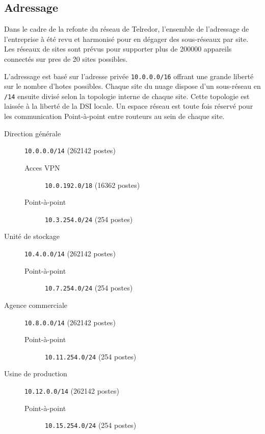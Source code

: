 \documentclass{article}
\newcommand{\tlr}{Telredor\xspace}
\begin{document}
\subsection{Adressage}

Dans le cadre de la refonte du réseau de \tlr, l'ensemble de l'adressage de l'entreprise à été revu et harmonisé pour en dégager des sous-réseaux par site.
Les réseaux de sites sont prévus pour supporter plus de 200000 appareils connectés sur pres de 20 sites possibles.

L'adressage est basé sur l'adresse privée \texttt{10.0.0.0/16} offrant une grande liberté sur le nombre d'hotes possibles.
Chaque site du nuage dispose d'un sous-réseau en \texttt{/14} ensuite divisé selon la topologie interne de chaque site.
Cette topologie est laissée à la liberté de la DSI locale.
Un espace réseau est toute fois réservé pour les communication Point-à-point entre routeurs au sein de chaque site.

\bigskip

\begin{description}
	\item[Direction générale] \texttt{10.0.0.0/14} (262142 postes)
	\begin{description}
		\item[Acces VPN] \texttt{10.0.192.0/18} (16362 postes)
		\item[Point-à-point] \texttt{10.3.254.0/24} (254 postes)
	\end{description}
	\item[Unité de stockage] \texttt{10.4.0.0/14} (262142 postes)
	\begin{description}
		\item[Point-à-point] \texttt{10.7.254.0/24} (254 postes)
	\end{description}
	\item[Agence commerciale] \texttt{10.8.0.0/14} (262142 postes)
	\begin{description}
		\item[Point-à-point] \texttt{10.11.254.0/24} (254 postes)
	\end{description}
	\item[Usine de production] \texttt{10.12.0.0/14} (262142 postes)
	\begin{description}
		\item[Point-à-point] \texttt{10.15.254.0/24} (254 postes)
	\end{description}
\end{description}

\bigskip
\end{document}
